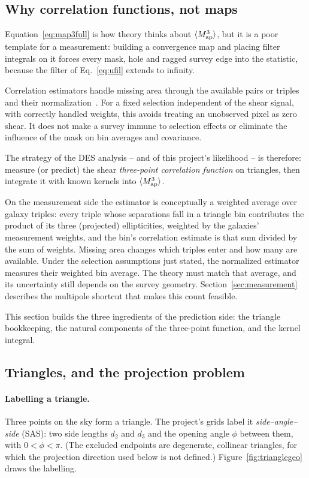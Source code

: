 \documentclass[11pt]{article}
\newcommand{\Map}{M_{\rm ap}}
\numberwithin{equation}{section}
\begin{document}
\subsection{Why correlation functions, not maps}
\label{sec:whycorr}

Equation~\eqref{eq:map3full} is how theory thinks about
$\langle\Map^3\rangle$, but it is a poor template for a measurement:
building a convergence map and placing filter integrals on it forces
every mask, hole and ragged survey edge into the statistic, because
the filter of Eq.~\eqref{eq:ufil} extends to infinity.

Correlation estimators handle missing area through the available pairs
or triples and their normalization~\cite{JBJ}. For a fixed selection
independent of the shear signal, with correctly handled weights, this
avoids treating an unobserved pixel as zero shear. It does not make a
survey immune to selection effects or eliminate the influence of the
mask on bin averages and covariance.

The strategy of the DES analysis -- and of this project's
likelihood -- is therefore: measure (or predict) the shear
\emph{three-point correlation function} on triangles, then integrate
it with known kernels into $\langle\Map^3\rangle$.

On the measurement side the estimator is conceptually a weighted
average over galaxy triples: every triple whose separations fall in
a triangle bin contributes the product of its three (projected)
ellipticities, weighted by the galaxies' measurement weights, and
the bin's correlation estimate is that sum divided by the sum of
weights.  Missing area changes which triples enter and how many are available.
Under the selection assumptions just stated, the normalized estimator
measures their weighted bin average. The theory must match that average,
and its uncertainty still depends on the survey geometry.
Section~\ref{sec:measurement} describes the multipole shortcut that
makes this count feasible.

This section builds the three ingredients of the prediction side:
the triangle bookkeeping, the natural components of the three-point
function, and the kernel integral.

\subsection{Triangles, and the projection problem}
\label{sec:natural}

\paragraph{Labelling a triangle.}
Three points on the sky form a triangle.  The project's grids label
it \emph{side--angle--side} (SAS): two side lengths $d_2$ and $d_3$
and the opening angle $\phi$ between them, with
$0 < \phi < \pi$.  (The excluded endpoints are degenerate, collinear
triangles, for which the projection direction used below is not
defined.)  Figure~\ref{fig:trianglegeo} draws the labelling.
\end{document}
